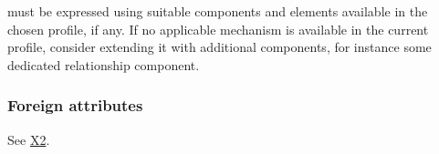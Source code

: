 must be expressed using suitable components and elements available in the chosen profile, if any. If no applicable mechanism is available in the current profile, consider extending it with additional components, for instance some dedicated relationship component.

\begin{workinprogress}
\subsubsection{Foreign attributes}\label{foreign-attributes}



See \hyperref[x2]{X2}.

\end{workinprogress}